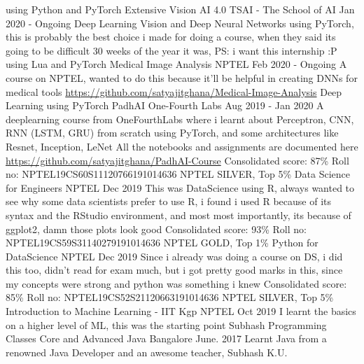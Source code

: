\begin{cventries}
    \cventry
        {using Python and PyTorch}
        {Extensive Vision AI 4.0}
        {TSAI - The School of AI}
        {Jan 2020 - Ongoing}
        {Deep Learning Vision and Deep Neural Networks using PyTorch, this is probably the best
        choice i made for doing a course, when they said its going to be difficult 30 weeks of the year
        it was, PS: i want this internship :P}
    \cventry
        {using Lua and PyTorch}
        {Medical Image Analysis}
        {NPTEL}
        {Feb 2020 - Ongoing}
        {A course on NPTEL, wanted to do this because it'll be helpful in creating DNNs for medical tools
        \url{https://github.com/satyajitghana/Medical-Image-Analysis}
        }
    \cventry
        {Deep Learning using PyTorch}
        {PadhAI}
        {One-Fourth Labs}
        {Aug 2019 - Jan 2020}
        {A deeplearning course from OneFourthLabs where i learnt about Perceptron, CNN, RNN (LSTM, GRU) from scratch using PyTorch,
        and some architectures like Resnet, Inception, LeNet
        All the notebooks and assignments are documented here
        \url{https://github.com/satyajitghana/PadhAI-Course}
        }
    \cventry
        {Consolidated score: 87\% Roll no: NPTEL19CS60S11120766191014636 NPTEL SILVER, Top 5\%}
        {Data Science for Engineers}
        {NPTEL}
        {Dec 2019}
        {This was DataScience using R, always wanted to see why some data scientists prefer to use R,
        i found i used R because of its syntax and the RStudio environment, and most most importantly,
        its because of ggplot2, damn those plots look good}
    \cventry
        {Consolidated score: 93\% Roll no: NPTEL19CS59S31140279191014636 NPTEL GOLD, Top 1\%}
        {Python for DataScience}
        {NPTEL}
        {Dec 2019}
        {Since i already was doing a course on DS, i did this too, didn't read for exam much, but i got
        pretty good marks in this, since my concepts were strong and python was something i knew}
    \cventry
        {Consolidated score: 85\% Roll no: NPTEL19CS52S21120663191014636 NPTEL SILVER, Top 5\%}
        {Introduction to Machine Learning - IIT Kgp}
        {NPTEL}
        {Oct 2019}
        {I learnt the basics on a higher level of ML, this was the starting point}
    \cventry
        {Subhash Programming Classes}
        {Core and Advanced Java}
        {Bangalore}
        {June. 2017}
        {Learnt Java from a renowned Java Developer and an awesome teacher, Subhash K.U.}
\end{cventries}